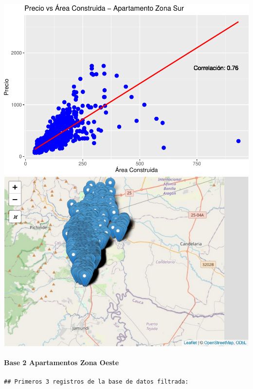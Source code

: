 \documentclass[
]{article}
\begin{document}
\includegraphics{A2_U2_InformeEjecutivo_files/figure-latex/unnamed-chunk-25-1.pdf}
\includegraphics{A2_U2_InformeEjecutivo_files/figure-latex/unnamed-chunk-25-2.pdf}

\paragraph{\texorpdfstring{\textbf{Base 2 Apartamentos Zona
Oeste}}{Base 2 Apartamentos Zona Oeste}}\label{base-2-apartamentos-zona-oeste}

\begin{verbatim}
## Primeros 3 registros de la base de datos filtrada:
\end{verbatim}
\end{document}
